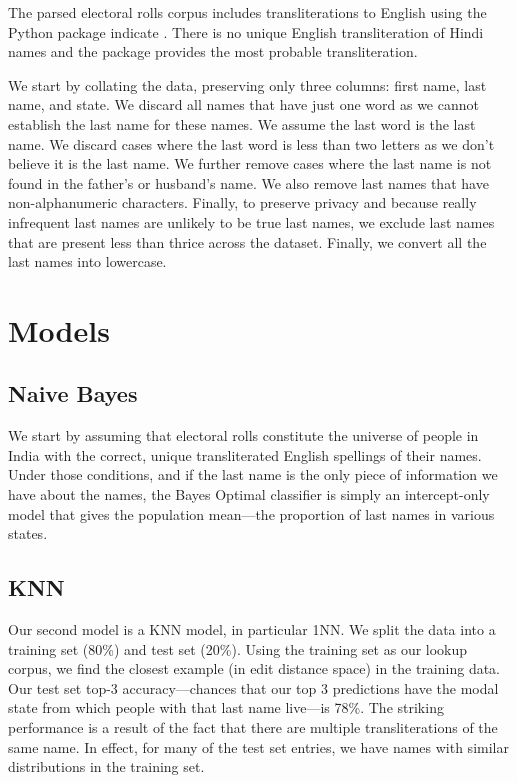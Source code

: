 \documentclass[11pt,  letterpaper]{article}
\begin{document}
The parsed electoral rolls corpus \citep{DVN/MUEGDT_2018} includes transliterations to English using the Python package indicate \citep{Chintalapati_Indicate_Transliterate_Indic_2022}. There is no unique English transliteration of Hindi names and the package provides the most probable transliteration. 

We start by collating the data, preserving only three columns: first name, last name, and state. We discard all names that have just one word as we cannot establish the last name for these names. We assume the last word is the last name. We discard cases where the last word is less than two letters as we don't believe it is the last name. We further remove cases where the last name is not found in the father's or husband's name. We also remove last names that have non-alphanumeric characters. Finally, to preserve privacy and because really infrequent last names are unlikely to be true last names, we exclude last names that are present less than thrice across the dataset. Finally, we convert all the last names into lowercase. 

\section{Models}

\subsection{Naive Bayes}

We start by assuming that electoral rolls constitute the universe of people in India with the correct, unique transliterated English spellings of their names. Under those conditions, and if the last name is the only piece of information we have about the names, the Bayes Optimal classifier is simply an intercept-only model that gives the population mean---the proportion of last names in various states. 

\subsection{KNN}

Our second model is a KNN model, in particular 1NN. We split the data into a training set (80\%) and test set (20\%). Using the training set as our lookup corpus, we find the closest example (in edit distance space) in the training data. Our test set top-3 accuracy---chances that our top 3 predictions have the modal state from which people with that last name live---is 78\%. The striking performance is a result of the fact that there are multiple transliterations of the same name. In effect, for many of the test set entries, we have names with similar distributions in the training set. 
\end{document}
